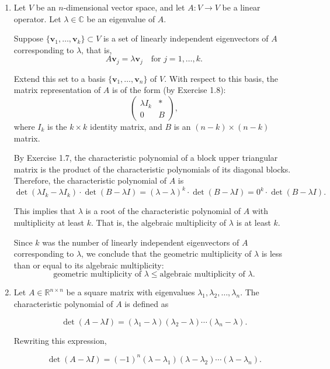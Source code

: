 \documentclass[12pt]{article}
\begin{document}
\begin{enumerate}
\item 
Let \( V \) be an \( n \)-dimensional vector space, and let \( A: V \to V \) be a linear operator. Let \( \lambda \in \mathbb{C} \) be an eigenvalue of \( A \).

Suppose \( \{\mathbf{v}_1, \dots, \mathbf{v}_k\} \subset V \) is a set of linearly independent eigenvectors of \( A \) corresponding to \( \lambda \), that is,
\[
A\mathbf{v}_j = \lambda \mathbf{v}_j \quad \text{for } j = 1, \dots, k.
\]

Extend this set to a basis \( \{\mathbf{v}_1, \dots, \mathbf{v}_n\} \) of \( V \). With respect to this basis, the matrix representation of \( A \) is of the form (by Exercise 1.8):
\[
\begin{pmatrix}
\lambda I_k & * \\
0 & B
\end{pmatrix},
\]
where \( I_k \) is the \( k \times k \) identity matrix, and \( B \) is an \( (n-k) \times (n-k) \) matrix.

By Exercise 1.7, the characteristic polynomial of a block upper triangular matrix is the product of the characteristic polynomials of its diagonal blocks. Therefore, the characteristic polynomial of \( A \) is
\[
\det(\lambda I_k - \lambda I_k) \cdot \det(B - \lambda I) = (\lambda - \lambda)^k \cdot \det(B - \lambda I) = 0^k \cdot \det(B - \lambda I).
\]

This implies that \( \lambda \) is a root of the characteristic polynomial of \( A \) with multiplicity at least \( k \). That is, the algebraic multiplicity of \( \lambda \) is at least \( k \).

Since \( k \) was the number of linearly independent eigenvectors of \( A \) corresponding to \( \lambda \), we conclude that the geometric multiplicity of \( \lambda \) is less than or equal to its algebraic multiplicity:
\[
\text{geometric multiplicity of } \lambda \leq \text{algebraic multiplicity of } \lambda.
\]

\item Let \( A \in \mathbb{R}^{n \times n} \) be a square matrix with eigenvalues \( \lambda_1, \lambda_2, \dots, \lambda_n \). The characteristic polynomial of \( A \) is defined as

\[
\det(A - \lambda I) = (\lambda_1 - \lambda)(\lambda_2 - \lambda) \cdots (\lambda_n - \lambda).
\]

Rewriting this expression,

\[
\det(A - \lambda I) = (-1)^n (\lambda - \lambda_1)(\lambda - \lambda_2) \cdots (\lambda - \lambda_n).
\]


\end{enumerate}
\end{document}
